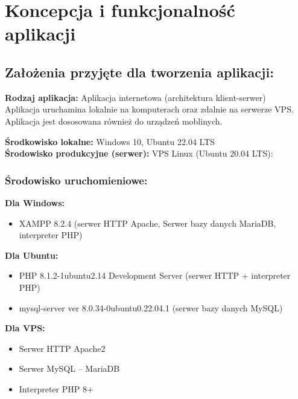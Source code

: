 \section{Koncepcja i funkcjonalność aplikacji}

\subsection{Założenia przyjęte dla tworzenia aplikacji:}
\begin{flushleft}

    \textbf{Rodzaj aplikacja:} Aplikacja internetowa (architektura klient-serwer) \\

    Aplikacja uruchamina lokalnie na komputerach oraz zdalnie na serwerze VPS. \\
    Aplikacja jest dososowana również do urządzeń moblinych. \newline\newline

    \textbf{Środkowisko lokalne:} Windows 10, Ubuntu 22.04 LTS \\
    \textbf{Środowisko produkcyjne (serwer):} VPS Linux (Ubuntu 20.04 LTS): \\ 

    \subsubsection{Środowisko uruchomieniowe:}

    \textbf{Dla Windows:}
    \begin{itemize}
        \item XAMPP 8.2.4 (serwer HTTP Apache, Serwer bazy danych MariaDB, interpreter PHP)
    \end{itemize}
        
    \textbf{Dla Ubuntu:}
    \begin{itemize}
        \item PHP 8.1.2-1ubuntu2.14 Development Server (serwer HTTP + interpreter PHP)
        \item mysql-server  ver 8.0.34-0ubuntu0.22.04.1 (serwer bazy danych MySQL)
    \end{itemize}

    \textbf{Dla VPS:}
    \begin{itemize}
        \item Serwer HTTP Apache2
        \item Serwer MySQL – MariaDB
        \item Interpreter PHP 8+
    \end{itemize}
    
\end{flushleft}

